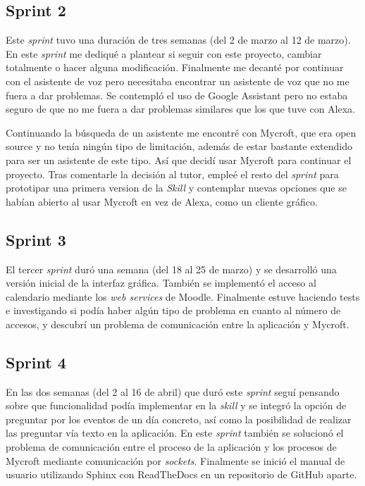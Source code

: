 \subsection{Sprint 2}

Este \textit{sprint} tuvo una duración de tres semanas (del 2 de marzo al 12 de marzo). En este \textit{sprint} me dediqué a plantear si seguir con este proyecto, cambiar totalmente o hacer alguna modificación. Finalmente me decanté por continuar con el asistente de voz pero necesitaba encontrar un asistente de voz que no me fuera a dar problemas. Se contempló el uso de Google Assistant pero no estaba seguro de que no me fuera a dar problemas similares que los que tuve con Alexa.

Continuando la búsqueda de un asistente me encontré con Mycroft, que era open source y no tenía ningún tipo de limitación, además de estar bastante extendido para ser un asistente de este tipo. Así que decidí usar Mycroft para continuar el proyecto.
Tras comentarle la decisión al tutor, empleé el resto del \textit{sprint} para prototipar una primera version de la \textit{Skill} y contemplar nuevas opciones que se habían abierto al usar Mycroft en vez de Alexa, como un cliente gráfico.

\subsection{Sprint 3}

El tercer \textit{sprint} duró una semana (del 18 al 25 de marzo) y se desarrolló una versión inicial de la interfaz gráfica. También se implementó el acceso al calendario mediante los \textit{web services} de Moodle. Finalmente estuve haciendo tests e investigando si podía haber algún tipo de problema en cuanto al número de accesos, y descubrí un problema de comunicación entre la aplicación y Mycroft.

\subsection{Sprint 4}

En las dos semanas (del 2 al 16 de abril) que duró este \textit{sprint} seguí pensando sobre que funcionalidad podía implementar en la \textit{skill} y se integró la opción de preguntar por los eventos de un día concreto, así como la posibilidad de realizar las preguntar vía texto en la aplicación. En este \textit{sprint} también se solucionó el problema de comunicación entre el proceso de la aplicación y los procesos de Mycroft mediante comunicación por \textit{sockets}. Finalmente se inició el manual de usuario utilizando Sphinx con ReadTheDocs en un repositorio de GitHub aparte.

